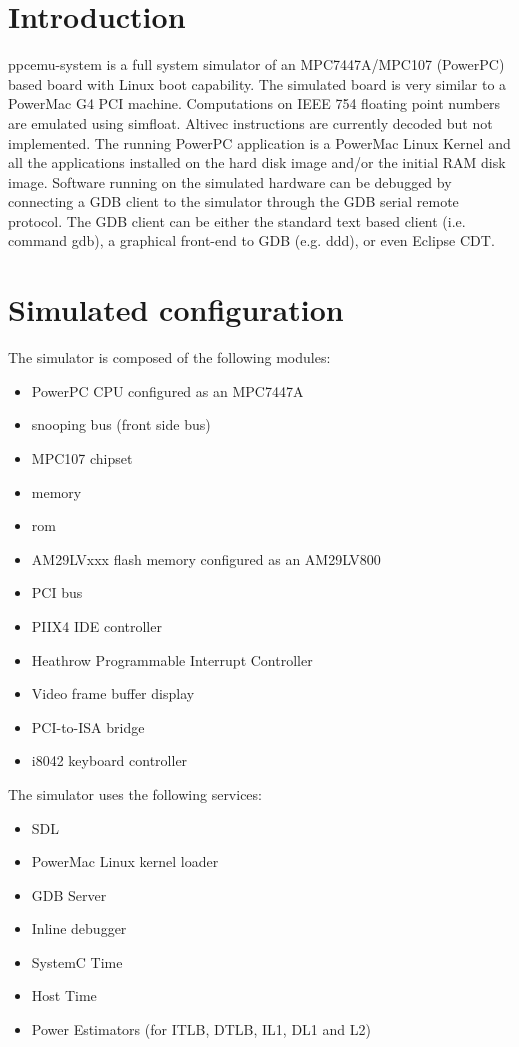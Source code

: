 \section{Introduction}

ppcemu-system is a full system simulator of an MPC7447A/MPC107 (PowerPC) based board with Linux boot capability. The simulated board is very similar to a PowerMac G4 PCI machine. Computations on IEEE 754 floating point numbers are emulated using simfloat. Altivec instructions are currently decoded but not implemented. The running PowerPC application is a PowerMac Linux Kernel and all the applications installed on the hard disk image and/or the initial RAM disk image. Software running on the simulated hardware can be debugged by connecting a GDB client to the simulator through the GDB serial remote protocol. The GDB client can be either the standard text based client (i.e. command gdb), a graphical front-end to GDB (e.g. ddd), or even Eclipse CDT.

\section{Simulated configuration}

The simulator is composed of the following modules:
\begin{itemize}\addtolength{\itemsep}{-0.40\baselineskip}
\item PowerPC CPU configured as an MPC7447A
\item snooping bus (front side bus)
\item MPC107 chipset
\item memory
\item rom
\item AM29LVxxx flash memory configured as an AM29LV800
\item PCI bus
\item PIIX4 IDE controller
\item Heathrow Programmable Interrupt Controller
\item Video frame buffer display
\item PCI-to-ISA bridge
\item i8042 keyboard controller
\end{itemize}

The simulator uses the following services:
\begin{itemize}\addtolength{\itemsep}{-0.40\baselineskip}
\item SDL
\item PowerMac Linux kernel loader
\item GDB Server
\item Inline debugger
\item SystemC Time
\item Host Time
\item Power Estimators (for ITLB, DTLB, IL1, DL1 and L2)
\end{itemize}

